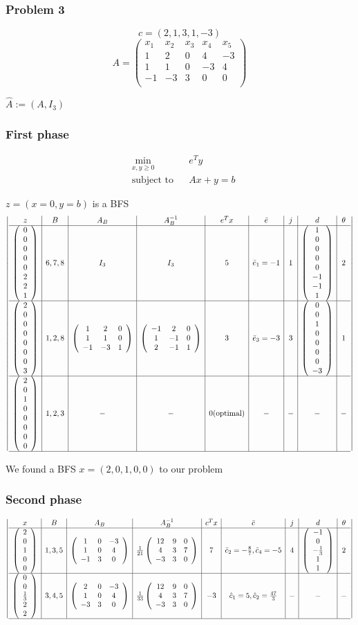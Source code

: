 \documentclass[12pt]{article}
\newcommand{\Q}[1]{\subsubsection*{Problem #1}}
\newcommand{\optimize}[4]
{
\begin{align*}
& \underset{#1}{\text{#4}}
& & #2 \\
& \text{subject to}
& & #3
\end{align*}
}
\newcommand{\minimize}[3]{\optimize{#1}{#2}{#3}{min}}
\newcommand{\Ab}[9]{
\left(
\begin{array}{ccc}
#1&#2&#3 \\
#4&#5&#6 \\
#7&#8&#9 \\
\end{array} 
\right)
}
\newcommand{\Dir}[5]{
\left(
\begin{array}{c}
#1\\#2\\#3\\#4\\#5
\end{array} 
\right)
}
\newcommand{\BDir}[8]{
\left(
\begin{array}{c}
#1\\#2\\#3\\#4\\#5\\#6\\#7\\#8
\end{array} 
\right)
}
\begin{document}
\Q{3}
$$c = (2, 1, 3, 1, -3)$$
\[ A = \left(
\begin{array}{r|r|r|r|r}
x_1&x_2&x_3&x_4&x_5\\
\hline
1&2&0&4&-3 \\
1&1&0&-3&4 \\
-1&-3&3&0&0 \\
\end{array} 
\right) \]

$\hat A := (A, I_3)$

\subsubsection*{First phase}
\minimize{x, y \geq 0}{e^Ty}{Ax + y = b}
$z = (x = 0, y = b)$ is a BFS
\[\left| 
\begin{array}{c|c|c|c|c|c|c|c|c}
  z & B & A_B & A_B^{-1} & e^Tx & \bar e & j & d & \theta\\
  \hline
   \BDir 0 0 0 0 0 2 2 1 & 6,7,8 & I_3 &
   I_3 &
   5 & \bar e_1 = -1 & 1 & \BDir 1 0 0 0 0 {-1} {-1} 1  & 2 \\
   \hline
   \BDir 2 0 0 0 0 0 0 3 & 1,2,8 & \Ab 1 2 0 1 1 0 {-1} {-3} 1 &
   \Ab {-1}  2 0  1 {-1} 0 2 {-1} 1 &
   3 & \bar e_3 = -3 & 3 & \BDir 0 0 1 0 0 0 0  {-3}  & 1 \\
   \hline
   \BDir 2 0 1 0 0 0 0 0 & 1,2,3 & - &- &
   0 \text{(optimal)} &  - & - & - & - \\
   \hline
\end{array} 
\right| \]

We found a BFS $x = (2, 0, 1, 0, 0)$ to our problem


\subsubsection*{Second phase}
\[\left| 
\begin{array}{c|c|c|c|c|c|c|c|c}
  x & B & A_B & A_B^{-1} & c^Tx & \bar c & j & d & \theta\\
  \hline
   \Dir 2 0 1 0 0 & 1, 3, 5 & \Ab 1 0 {-3} 1 0 4 {-1} 3 0 &
   \frac{1}{21} \Ab {12} 9 0 4 3 7 {-3} 3 0 &
   7 & \bar c_2 =  -\frac{8}{7}, \bar c_4 = -5 & 4 & \Dir {-1} 0 {-\frac{1}{3}} 1 1  & 2 \\
   \hline
   \Dir 0 0 {\frac{1}{3}} 2 2
   & 3,4,5 & \Ab 2 0 {-3} 1 0 4 {-3} 3 0  &
   \frac{1}{33} \Ab {12} 9 0 4 3 7 {-3} 3 0 &
   -3 & \hat c_1 = 5, \hat c_2 = \frac{47}{3} & - & - & -\\
   \hline
\end{array} 
\right| \]
\end{document}
